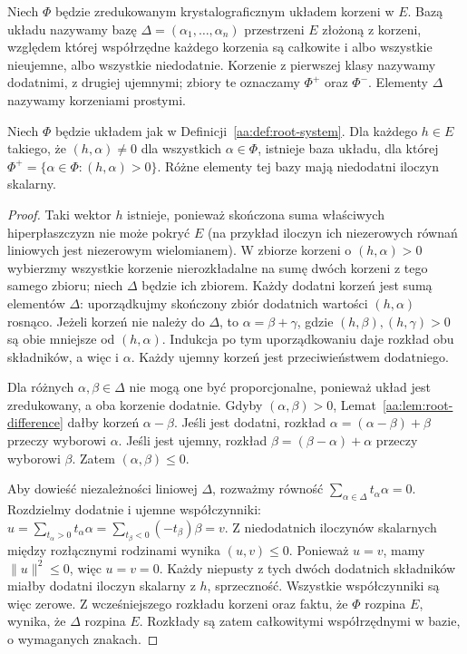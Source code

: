 \begin{definicja}
\label{aa:def:root-base}
Niech $\Phi$ będzie zredukowanym krystalograficznym
układem korzeni w $E$. Bazą układu nazywamy bazę
$\Delta=(\alpha_1,\ldots,\alpha_n)$ przestrzeni $E$
złożoną z korzeni, względem której współrzędne
każdego korzenia są całkowite i albo wszystkie
nieujemne, albo wszystkie niedodatnie.
Korzenie z pierwszej klasy nazywamy dodatnimi,
z drugiej ujemnymi; zbiory te oznaczamy
$\Phi^+$ oraz $\Phi^-$.
Elementy $\Delta$ nazywamy korzeniami prostymi.
\end{definicja}

\begin{twierdzenie}
\label{aa:tw:root-base}
Niech $\Phi$ będzie układem jak w
Definicji~\ref{aa:def:root-system}. Dla każdego
$h\in E$ takiego, że $(h,\alpha)\ne0$ dla
wszystkich $\alpha\in\Phi$, istnieje baza układu,
dla której $\Phi^+=\{\alpha\in\Phi:(h,\alpha)>0\}$.
Różne elementy tej bazy mają niedodatni iloczyn skalarny.
\end{twierdzenie}
\begin{proof}
Taki wektor $h$ istnieje, ponieważ skończona suma
właściwych hiperpłaszczyzn nie może pokryć $E$
(na przykład iloczyn ich niezerowych równań liniowych
jest niezerowym wielomianem).
W zbiorze korzeni o $(h,\alpha)>0$ wybierzmy wszystkie
korzenie nierozkładalne na sumę dwóch korzeni z tego
samego zbioru; niech $\Delta$ będzie ich zbiorem.
Każdy dodatni korzeń jest sumą elementów $\Delta$:
uporządkujmy skończony zbiór dodatnich wartości
$(h,\alpha)$ rosnąco. Jeżeli korzeń nie należy do
$\Delta$, to $\alpha=\beta+\gamma$, gdzie
$(h,\beta),(h,\gamma)>0$ są obie mniejsze od
$(h,\alpha)$. Indukcja po tym uporządkowaniu
daje rozkład obu składników, a więc i $\alpha$.
Każdy ujemny korzeń jest przeciwieństwem dodatniego.

Dla różnych $\alpha,\beta\in\Delta$ nie mogą one być
proporcjonalne, ponieważ układ jest zredukowany,
a oba korzenie dodatnie. Gdyby $(\alpha,\beta)>0$,
Lemat~\ref{aa:lem:root-difference} dałby korzeń
$\alpha-\beta$. Jeśli jest dodatni, rozkład
$\alpha=(\alpha-\beta)+\beta$ przeczy wyborowi $\alpha$.
Jeśli jest ujemny, rozkład
$\beta=(\beta-\alpha)+\alpha$ przeczy wyborowi $\beta$.
Zatem $(\alpha,\beta)\le0$.

Aby dowieść niezależności liniowej $\Delta$, rozważmy
równość $\sum_{\alpha\in\Delta}t_\alpha\alpha=0$.
Rozdzielmy dodatnie i ujemne współczynniki:
$u=\sum_{t_\alpha>0}t_\alpha\alpha
=\sum_{t_\beta<0}(-t_\beta)\beta=v$.
Z niedodatnich iloczynów skalarnych między rozłącznymi
rodzinami wynika $(u,v)\le0$. Ponieważ $u=v$,
mamy $\|u\|^2\le0$, więc $u=v=0$. Każdy niepusty
z tych dwóch dodatnich składników miałby dodatni
iloczyn skalarny z $h$, sprzeczność.
Wszystkie współczynniki są więc zerowe.
Z wcześniejszego rozkładu korzeni oraz faktu,
że $\Phi$ rozpina $E$, wynika, że $\Delta$ rozpina $E$.
Rozkłady są zatem całkowitymi współrzędnymi
w bazie, o wymaganych znakach.
\end{proof}

